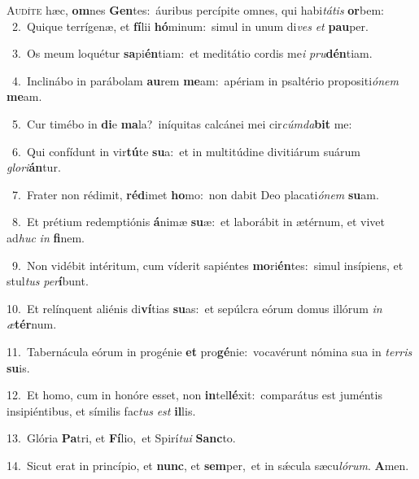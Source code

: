 \lettrine{\initial\textcolor{\initialcolor}{A}}{udíte} hæc, \textbf{om}\-nes \textbf{Gen}\-tes:~\star áuribus percípite omnes, qui habi\-\textit{tá}\-\textit{tis} \textbf{or}\-bem:\\
{\numbfont\textcolor{\numbcolor}{~2.}}~Quique terrígenæ, et \textbf{fí}\-lii \textbf{hó}\-minum:~\star simul in unum di\textit{ves} \textit{et} \textbf{pau}\-per.\par
{\numbfont\textcolor{\numbcolor}{~3.}}~Os meum loquétur \textbf{sa}\-pi\-\textbf{én}\-tiam:~\star et meditátio cordis me\textit{i} \textit{pru}\-\textbf{dén}tiam.\par
{\numbfont\textcolor{\numbcolor}{~4.}}~Inclinábo in parábolam \textbf{au}\-rem \textbf{me}\-am:~\star apériam in psaltério propositi\-\textit{ó}\-\textit{nem} \textbf{me}\-am.\par
{\numbfont\textcolor{\numbcolor}{~5.}}~Cur timébo in \textbf{di}\-e \textbf{ma}\-la?~\star iníquitas calcánei mei cir\-\textit{cúm}\-\textit{da}\textbf{bit} me:\par
{\numbfont\textcolor{\numbcolor}{~6.}}~Qui confídunt in vir\-\textbf{tú}\-te \textbf{su}\-a:~\star et in multitúdine divitiárum suárum \textit{glo}\-\textit{ri}\textbf{án}tur.\par
{\numbfont\textcolor{\numbcolor}{~7.}}~Frater non rédimit, \textbf{réd}\-imet \textbf{ho}\-mo:~\star non dabit Deo placati\-\textit{ó}\-\textit{nem} \textbf{su}\-am.\par
{\numbfont\textcolor{\numbcolor}{~8.}}~Et prétium redemptiónis \textbf{á}\-nimæ \textbf{su}\-æ:~\star et laborábit in ætérnum, et vivet ad\textit{huc} \textit{in} \textbf{fi}\-nem.\par
{\numbfont\textcolor{\numbcolor}{~9.}}~Non vidébit intéritum, cum víderit sapiéntes \textbf{mo}\-ri\-\textbf{én}\-tes:~\star simul insípiens, et stul\textit{tus} \textit{per}\-\textbf{í}bunt.\par
{\numbfont\textcolor{\numbcolor}{10.}}~Et relínquent aliénis di\-\textbf{ví}\-tias \textbf{su}\-as:~\star et sepúlcra eórum domus illórum \textit{in} \textit{æ}\-\textbf{tér}num.\par
{\numbfont\textcolor{\numbcolor}{11.}}~Tabernácula eórum in progénie \textbf{et} pro\-\textbf{gé}\-nie:~\star vocavérunt nómina sua in \textit{ter}\-\textit{ris} \textbf{su}\-is.\par
{\numbfont\textcolor{\numbcolor}{12.}}~Et homo, cum in honóre esset, non \textbf{in}\-tel\-\textbf{lé}\-xit:~\star comparátus est juméntis insipiéntibus, et símilis fac\textit{tus} \textit{est} \textbf{il}\-lis.\par
{\numbfont\textcolor{\numbcolor}{13.}}~Glória \textbf{Pa}\-tri, et \textbf{Fí}\-lio,~\star et Spirí\-\textit{tu}\-\textit{i} \textbf{Sanc}\-to.\par
{\numbfont\textcolor{\numbcolor}{14.}}~Sicut erat in princípio, et \textbf{nunc}\-, et \textbf{sem}\-per,~\star et in sǽcula sæcu\-\textit{ló}\-\textit{rum}. \textbf{A}\-men.\par
